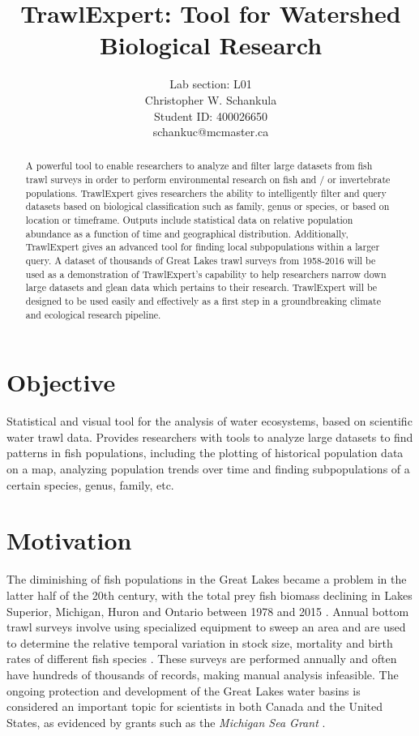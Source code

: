 \documentclass{article}
\begin{document}
\title{TrawlExpert: Tool for Watershed Biological Research}
\author{Lab section: L01 \\ Christopher W. Schankula \\Student ID: 400026650 \\schankuc@mcmaster.ca}

\maketitle

\begin{abstract}
\noindent A powerful tool to enable researchers to analyze and filter large datasets from fish trawl surveys in order to perform environmental research on fish and / or invertebrate populations. TrawlExpert gives researchers the ability to intelligently filter and query datasets based on biological classification such as family, genus or species, or based on location or timeframe. Outputs include statistical data on relative population abundance as a function of time and geographical distribution. Additionally, TrawlExpert gives an advanced tool for finding local subpopulations within a larger query. A dataset of thousands of Great Lakes trawl surveys from 1958-2016 will be used as a demonstration of TrawlExpert's capability to help researchers narrow down large datasets and glean data which pertains to their research. TrawlExpert will be designed to be used easily and effectively as a first step in a groundbreaking climate and ecological research pipeline.

\end{abstract}

\section{Objective}
Statistical and visual tool for the analysis of water ecosystems, based on scientific water trawl data. Provides researchers with tools to analyze large datasets to find patterns in fish populations, including the plotting of historical population data on a map, analyzing population trends over time and finding subpopulations of a certain species, genus, family, etc.

\section{Motivation}
The diminishing of fish populations in the Great Lakes became a problem in the latter half of the 20th century, with the total prey fish biomass declining in Lakes Superior, Michigan, Huron and Ontario between 1978 and 2015 \citep{michigan2017}. Annual bottom trawl surveys involve using specialized equipment to sweep an area and are used to determine the relative temporal variation in stock size, mortality and birth rates of different fish species \citep{walsh1997efficiency}. These surveys are performed annually and often have hundreds of thousands of records, making manual analysis infeasible. The ongoing protection and development of the Great Lakes water basins is considered an important topic for scientists in both Canada and the United States, as evidenced by grants such as the \textit{Michigan Sea Grant} \citep{michseagr2018}.
\end{document}
